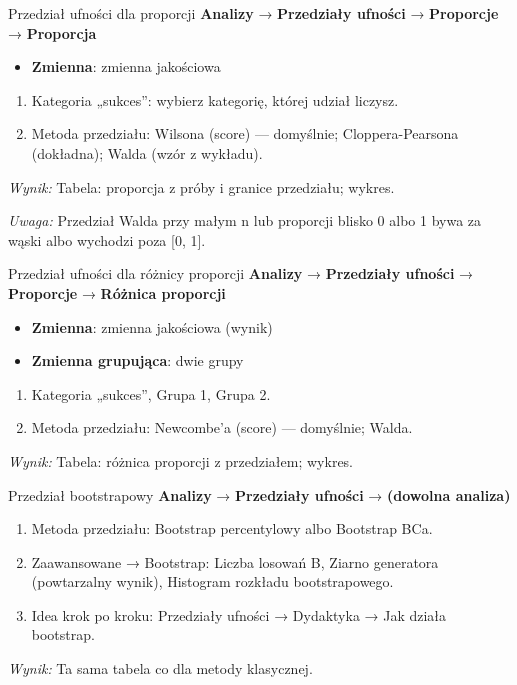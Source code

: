 \documentclass[
  polish,
  10pt,
  a4paper,
  DIV=11,
  numbers=noendperiod]{scrartcl}
\newcommand{\jmenu}[1]{{\color{upwraccent}\small #1}}
\begin{document}
\begin{jbox}{Przedział ufności dla proporcji}\label{w:ci-proporcja}
\jmenu{\textbf{Analizy} → \textbf{Przedziały ufności} → \textbf{Proporcje} → \textbf{Proporcja}}

\begin{itemize}
\item[$\triangleright$] \textbf{Zmienna}: zmienna jakościowa
\end{itemize}
\begin{enumerate}
\item Kategoria „sukces”: wybierz kategorię, której udział liczysz.
\item Metoda przedziału: Wilsona (score) — domyślnie; Cloppera-Pearsona (dokładna); Walda (wzór z wykładu).
\end{enumerate}
\textit{Wynik:} Tabela: proporcja z próby i granice przedziału; wykres.

{\color{upwrsoft}\small\textit{Uwaga:} Przedział Walda przy małym n lub proporcji blisko 0 albo 1 bywa za wąski albo wychodzi poza [0, 1].}
\end{jbox}

\begin{jbox}{Przedział ufności dla różnicy proporcji}\label{w:ci-roznica-proporcji}
\jmenu{\textbf{Analizy} → \textbf{Przedziały ufności} → \textbf{Proporcje} → \textbf{Różnica proporcji}}

\begin{itemize}
\item[$\triangleright$] \textbf{Zmienna}: zmienna jakościowa (wynik)
\item[$\triangleright$] \textbf{Zmienna grupująca}: dwie grupy
\end{itemize}
\begin{enumerate}
\item Kategoria „sukces”, Grupa 1, Grupa 2.
\item Metoda przedziału: Newcombe’a (score) — domyślnie; Walda.
\end{enumerate}
\textit{Wynik:} Tabela: różnica proporcji z przedziałem; wykres.

\end{jbox}

\begin{jbox}{Przedział bootstrapowy}\label{w:bootstrap}
\jmenu{\textbf{Analizy} → \textbf{Przedziały ufności} → \textbf{(dowolna analiza)}}

\begin{enumerate}
\item Metoda przedziału: Bootstrap percentylowy albo Bootstrap BCa.
\item Zaawansowane → Bootstrap: Liczba losowań B, Ziarno generatora (powtarzalny wynik), Histogram rozkładu bootstrapowego.
\item Idea krok po kroku: Przedziały ufności → Dydaktyka → Jak działa bootstrap.
\end{enumerate}
\textit{Wynik:} Ta sama tabela co dla metody klasycznej.

\end{jbox}
\end{document}
